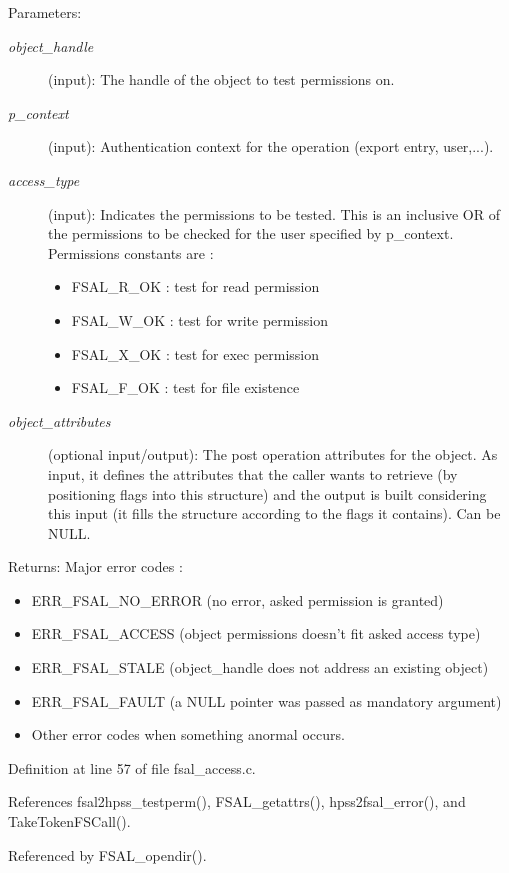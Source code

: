 \begin{Desc}
\item[Parameters:]
\begin{description}
\item[{\em object\_\-handle}](input): The handle of the object to test permissions on. \item[{\em p\_\-context}](input): Authentication context for the operation (export entry, user,...). \item[{\em access\_\-type}](input): Indicates the permissions to be tested. This is an inclusive OR of the permissions to be checked for the user specified by p\_\-context. Permissions constants are :\begin{itemize}
\item FSAL\_\-R\_\-OK : test for read permission\item FSAL\_\-W\_\-OK : test for write permission\item FSAL\_\-X\_\-OK : test for exec permission\item FSAL\_\-F\_\-OK : test for file existence \end{itemize}
\item[{\em object\_\-attributes}](optional input/output): The post operation attributes for the object. As input, it defines the attributes that the caller wants to retrieve (by positioning flags into this structure) and the output is built considering this input (it fills the structure according to the flags it contains). Can be NULL.\end{description}
\end{Desc}
\begin{Desc}
\item[Returns:]Major error codes :\begin{itemize}
\item ERR\_\-FSAL\_\-NO\_\-ERROR (no error, asked permission is granted)\item ERR\_\-FSAL\_\-ACCESS (object permissions doesn't fit asked access type)\item ERR\_\-FSAL\_\-STALE (object\_\-handle does not address an existing object)\item ERR\_\-FSAL\_\-FAULT (a NULL pointer was passed as mandatory argument)\item Other error codes when something anormal occurs. \end{itemize}
\end{Desc}


Definition at line 57 of file fsal\_\-access.c.

References fsal2hpss\_\-testperm(), FSAL\_\-getattrs(), hpss2fsal\_\-error(), and TakeTokenFSCall().

Referenced by FSAL\_\-opendir().